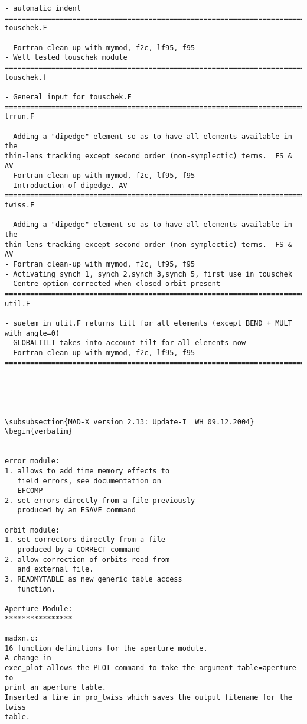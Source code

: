 \begin{verbatim}
- automatic indent
=============================================================================
touschek.F

- Fortran clean-up with mymod, f2c, lf95, f95
- Well tested touschek module
=============================================================================
touschek.f

- General input for touschek.F
=============================================================================
trrun.F

- Adding a "dipedge" element so as to have all elements available in the
thin-lens tracking except second order (non-symplectic) terms.  FS & AV
- Fortran clean-up with mymod, f2c, lf95, f95
- Introduction of dipedge. AV
=============================================================================
twiss.F

- Adding a "dipedge" element so as to have all elements available in the
thin-lens tracking except second order (non-symplectic) terms.  FS & AV
- Fortran clean-up with mymod, f2c, lf95, f95
- Activating synch_1, synch_2,synch_3,synch_5, first use in touschek
- Centre option corrected when closed orbit present
=============================================================================
util.F

- suelem in util.F returns tilt for all elements (except BEND + MULT
with angle=0)
- GLOBALTILT takes into account tilt for all elements now
- Fortran clean-up with mymod, f2c, lf95, f95
=============================================================================





\subsubsection{MAD-X version 2.13: Update-I  WH 09.12.2004}
\begin{verbatim}


error module:
1. allows to add time memory effects to
   field errors, see documentation on
   EFCOMP
2. set errors directly from a file previously
   produced by an ESAVE command

orbit module:
1. set correctors directly from a file 
   produced by a CORRECT command
2. allow correction of orbits read from
   and external file.
3. READMYTABLE as new generic table access
   function.

Aperture Module:
****************

madxn.c:
16 function definitions for the aperture module. 
A change in 
exec_plot allows the PLOT-command to take the argument table=aperture to 
print an aperture table.
Inserted a line in pro_twiss which saves the output filename for the twiss 
table.


\end{verbatim}
